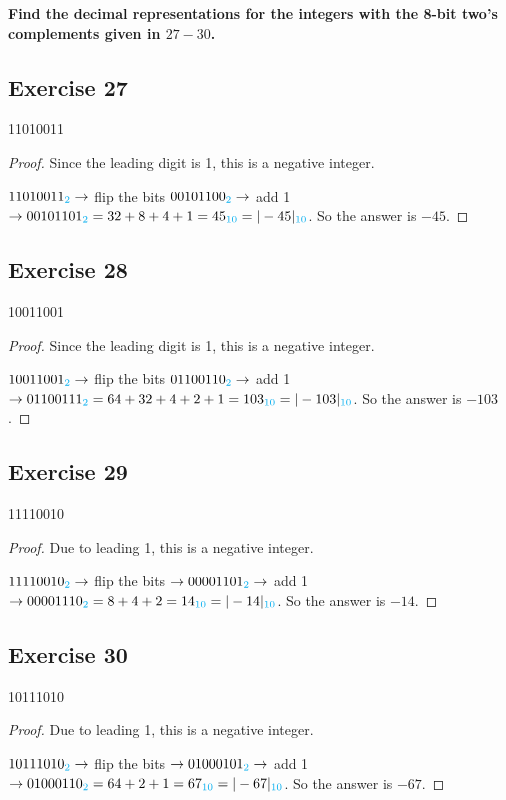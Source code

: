 \documentclass[14pt]{extarticle}
\newcommand{\base}[1]{{\color{cyan}#1}}
\begin{document}
{\bf\color{cyan} Find the decimal representations for the integers with the 8-bit two’s complements given in $27-30$.}

\subsection{Exercise 27} 
11010011

\begin{proof} 
Since the leading digit is 1, this is a negative integer.

$11010011_\base{2} \to $ flip the bits $00101100_\base{2} \to$ add 1 $\to 00101101_\base{2} = 32 + 8 + 4 + 1 = 45_\base{10} = |-45|_\base{10}$. So the answer is $-45$. 
\end{proof}

\subsection{Exercise 28} 
10011001

\begin{proof} 
Since the leading digit is 1, this is a negative integer.

$10011001_\base{2} \to $ flip the bits $01100110_\base{2} \to$ add 1 $\to 01100111_\base{2} = 64 + 32 + 4 + 2 + 1 = 103_\base{10} = |-103|_\base{10}$. So the answer is $-103$. 
\end{proof}

\subsection{Exercise 29} 
11110010

\begin{proof} 
Due to leading 1, this is a negative integer. 

$11110010_\base{2}
\to $ flip the bits $\to 00001101_\base{2} \to$ add 1 $\to 00001110_\base{2} = 8 + 4 + 2 = 14_\base{10} = |-14|_\base{10}$. So the answer is $-14$. 
\end{proof}

\subsection{Exercise 30} 
10111010

\begin{proof} 
Due to leading 1, this is a negative integer. 

$10111010_\base{2} \to $ flip the bits $\to 01000101_\base{2} \to$ add 1 $\to 01000110_\base{2} = 64 + 2 + 1 = 67_\base{10} = |-67|_\base{10}$. So the answer is $-67$.
\end{proof}
\end{document}
